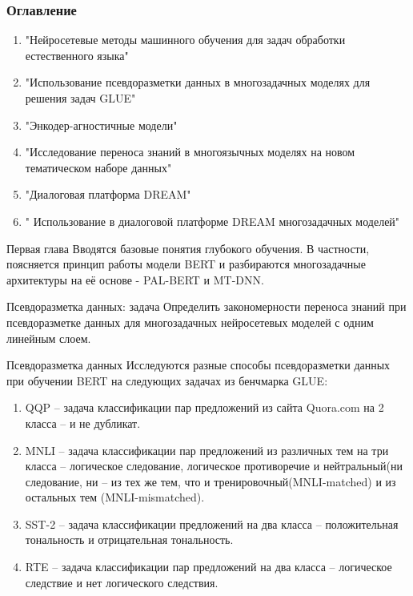 \begin{frame}
\frametitle{Оглавление}
\begin{enumerate}
    \item "Нейросетевые методы машинного обучения для задач обработки естественного языка"
    \item "Использование псевдоразметки данных в многозадачных моделях для решения задач GLUE"
    \item "Энкодер-агностичные модели"
    \item "Исследование переноса знаний в многоязычных моделях на новом тематическом наборе данных"
    \item "Диалоговая платформа DREAM"
    \item " Использование в диалоговой платформе {DREAM} многозадачных моделей"
\end{enumerate}
\end{frame}

\begin{frame}{Первая глава}
Вводятся базовые понятия глубокого обучения. В частности, поясняется принцип работы модели BERT и разбираются многозадачные архитектуры на её основе - PAL-BERT и MT-DNN.
\end{frame}

\begin{frame}{Псевдоразметка данных: задача}
Определить закономерности переноса знаний при псевдоразметке данных для многозадачных нейросетевых моделей с одним линейным слоем.
\end{frame}
\begin{frame}{Псевдоразметка данных}
    Исследуются разные способы псевдоразметки данных при обучении BERT на следующих задачах из бенчмарка GLUE:
    \begin{enumerate}
    \item QQP -- задача классификации пар предложений из сайта Quora.com на 2 класса -- и не дубликат.
    \item MNLI -- задача классификации пар предложений из различных тем на три класса -- логическое следование, логическое противоречие и нейтральный(ни следование, ни 
    -- из тех же тем, что и тренировочный(MNLI-matched) и из остальных тем (MNLI-mismatched).
    \item SST-2 -- задача классификации предложений на два класса -- положительная тональность и отрицательная тональность.
    \item RTE -- задача классификации пар предложений на два класса -- логическое следствие и нет логического следствия.
    \end{enumerate}
\end{frame}


